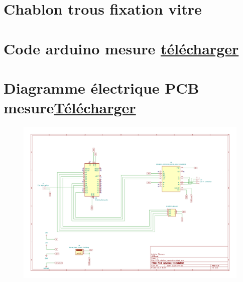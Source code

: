 \begin{figure}[H]
    \centering
    
\end{figure}


\newpage
\section[Chablon trous vitre]{Chablon trous fixation vitre}\label{chablon_trous_vitre}

\begin{figure}[H]
    \centering
    
\end{figure}

\newpage
\section[Code arduino mesure]{Code arduino mesure \href{https://1drv.ms/f/s!Altwa7Vt0GlIj4Bf6049yvu0P-8YLQ?e=v7KWOI}{télécharger}}\label{code:arduino_mesure}



\section[Diagramme électrique PCB mesure]{Diagramme électrique PCB mesure\href{https://1drv.ms/f/s!Altwa7Vt0GlIjv0bGlDjWqrtS53P8w?e=SVTypX}{Télécharger}}\label{PCB:mesure}
\begin{figure}[H]
    \centering
    \includegraphics[angle = 90,height = 0.8\paperheight]{assets/Annexes/PCB_rotation_translation_diagramme_elec.pdf}
\end{figure}